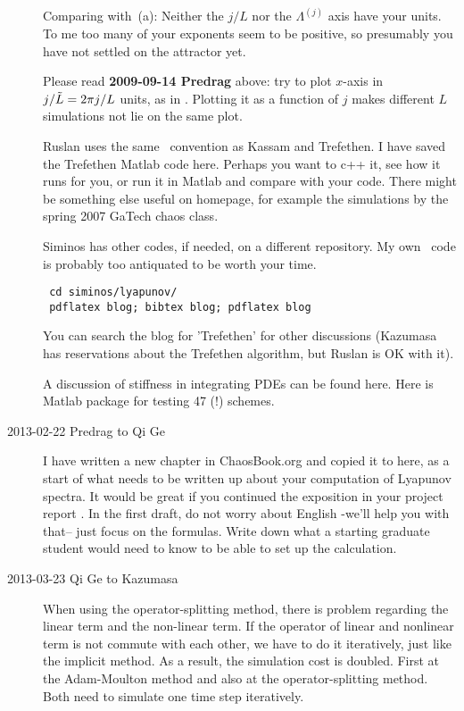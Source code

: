 \begin{description}
Comparing with
\,(a): Neither the $j/L$ nor the
$\Lambda^{(j)}$ axis have your units. To me too many of your exponents
seem to be positive, so presumably you have not settled on the
attractor yet.

Please read {\bf 2009-09-14 Predrag} above: try to plot  $x$-axis in
$j/\tilde{L} = 2 \pi j/L$ units, as in .
Plotting it as a function of $j$ makes different $L$ simulations not
lie on the same plot.

Ruslan uses the same \KSe\ convention as Kassam and
Trefethen. I have saved the Trefethen Matlab code
 {here}. Perhaps
you want to c++ it, see how it runs for you, or run it in Matlab and
compare with your code. There might be something else useful on
 homepage,
for example the simulations by the spring 2007 GaTech chaos class.

Siminos has other codes, if needed, on a different repository. My own
\KS\ code is probably too antiquated to be worth your time.

\begin{verbatim}
 cd siminos/lyapunov/
 pdflatex blog; bibtex blog; pdflatex blog
\end{verbatim}

You can search the blog for 'Trefethen' for other discussions
(Kazumasa has reservations about the Trefethen algorithm,
but Ruslan is OK with it).

A discussion of stiffness in integrating PDEs can be found
{here}.  {Here} is Matlab
package for testing 47 (!) schemes.

\item[2013-02-22 Predrag to Qi Ge]
I have written a new chapter in ChaosBook.org and copied it to
 here, as a start of what needs to be written up
about your computation of Lyapunov spectra. It would be great if you
continued the exposition in your project report
. In the first draft, do not worry about
English -we'll help you with that-- just focus on the formulas. Write
down what a starting graduate student would need to know to be able
to set up the calculation.

\item[2013-03-23 Qi Ge to Kazumasa]
When using the operator-splitting method, there is problem regarding the linear term and the non-linear term. If the operator of linear and nonlinear term is not commute with each other, we have to do it iteratively, just like the implicit method. As a result, the simulation cost is doubled. First at the Adam-Moulton method and also at the operator-splitting method. Both need to simulate one time step iteratively.


\end{description}
